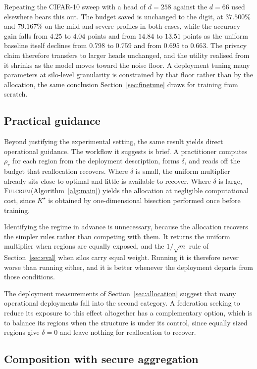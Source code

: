 \documentclass[acmsmall,screen,review,anonymous]{acmart}
\theoremstyle{acmdefinition}%
\newcommand{\Fulcrum}{\textsc{Fulcrum}\xspace}
\begin{document}
Repeating the CIFAR-10 sweep with a head of $d = 258$ against the $d = 66$ used
elsewhere bears this out. The budget saved is unchanged to the digit, at
$37.500\%$ and $79.167\%$ on the mild and severe profiles in both cases, while the
accuracy gain falls from $4.25$ to $4.04$ points and from $14.84$ to $13.51$
points as the uniform baseline itself declines from $0.798$ to $0.759$ and from
$0.695$ to $0.663$. The privacy claim therefore transfers to larger heads
unchanged, and the utility realised from it shrinks as the model moves toward the
noise floor. A deployment tuning many parameters at silo-level granularity is
constrained by that floor rather than by the allocation, the same conclusion
Section~\ref{sec:finetune} draws for training from scratch.

\subsection{Practical guidance}

Beyond justifying the experimental setting, the same result yields direct
operational guidance. The workflow it suggests is brief. A practitioner computes
$\rho_r$ for each region from the deployment description, forms $\delta$, and
reads off the budget that reallocation recovers. Where $\delta$ is small, the
uniform multiplier already sits close to optimal and little is available to
recover. Where $\delta$ is large, \Fulcrum (Algorithm~\ref{alg:main}) yields the
allocation at negligible computational cost, since $K^\star$ is obtained by
one-dimensional bisection performed once before training.

Identifying the regime in advance is unnecessary, because the allocation recovers
the simpler rules rather than competing with them. It returns the uniform
multiplier when regions are equally exposed, and the $1/\sqrt{m}$ rule of
Section~\ref{sec:eval} when silos carry equal weight. Running it is therefore
never worse than running either, and it is better whenever the deployment departs
from those conditions.

The deployment measurements of Section~\ref{sec:allocation} suggest that many
operational deployments fall into the second category. A federation seeking to
reduce its exposure to this effect altogether has a complementary option, which is
to balance its regions when the structure is under its control, since equally
sized regions give $\delta = 0$ and leave nothing for reallocation to recover.

\subsection{Composition with secure aggregation}
\label{sec:secagg}
\end{document}
